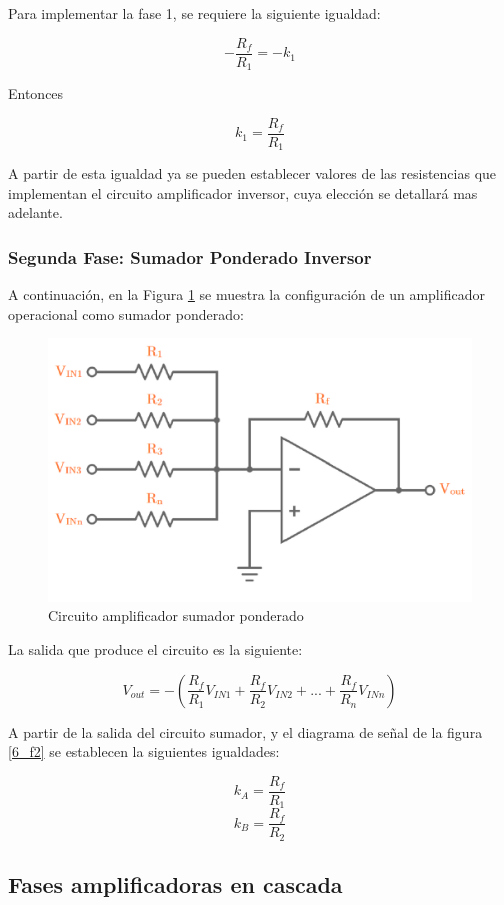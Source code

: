 Para implementar la fase 1, se requiere la siguiente igualdad:

\[-\frac{R_f}{R_1} = - k_1\]

Entonces

\[k_1 = \frac{R_f}{R_1}\]

A partir de esta igualdad ya se pueden establecer valores de las resistencias que implementan el circuito amplificador inversor, cuya elección se detallará mas adelante.

\subsubsection{Segunda Fase: Sumador Ponderado Inversor}
A continuación, en la Figura \ref{6_adder_opamp_fig} se muestra la configuración de un amplificador operacional como sumador ponderado:

\begin{figure}[H]
\centering
\includegraphics[scale=0.4]{../parte6/Informe/resources/adder_opamp_diagram.png}
\caption{Circuito amplificador sumador ponderado}
\label{6_adder_opamp_fig}
\end{figure}

La salida que produce el circuito es la siguiente:

\[V_{out} = - \left(\frac{R_f}{R_1} V_{IN1} + \frac{R_f}{R_2} V_{IN2} + ... + \frac{R_f}{R_n} V_{INn} \right)\]

A partir de la salida del circuito sumador, y el diagrama de señal de la figura \ref{6_f2} se establecen la siguientes igualdades:

\[k_A = \frac{R_f}{R_1}\]
\[k_B = \frac{R_f}{R_2}\]

\subsection{Fases amplificadoras en cascada}

